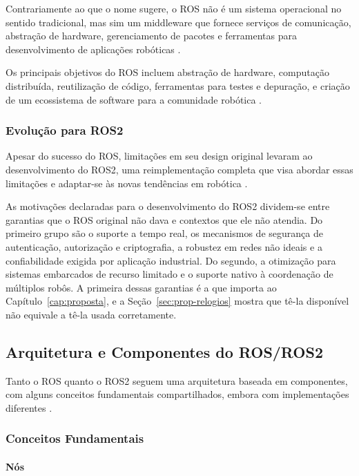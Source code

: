 Contrariamente ao que o nome sugere, o ROS não é um sistema operacional no sentido tradicional, mas sim um middleware que fornece serviços de comunicação, abstração de hardware, gerenciamento de pacotes e ferramentas para desenvolvimento de aplicações robóticas \cite{Quigley2009, Joseph2018}.

Os principais objetivos do ROS incluem abstração de hardware, computação distribuída, reutilização de código, ferramentas para testes e depuração, e criação de um ecossistema de software para a comunidade robótica \cite{Quigley2009}.

\subsubsection{Evolução para ROS2}

Apesar do sucesso do ROS, limitações em seu design original levaram ao desenvolvimento do ROS2, uma reimplementação completa que visa abordar essas limitações e adaptar-se às novas tendências em robótica \cite{Macenski2022}.

As motivações declaradas para o desenvolvimento do ROS2
\cite{Macenski2022, ROS2Design2024} dividem-se entre garantias que o ROS original não
dava e contextos que ele não atendia. Do primeiro grupo são o suporte a tempo real, os
mecanismos de segurança de autenticação, autorização e criptografia, a robustez em redes
não ideais e a confiabilidade exigida por aplicação industrial. Do segundo, a otimização
para sistemas embarcados de recurso limitado e o suporte nativo à coordenação de
múltiplos robôs. A primeira dessas garantias é a que importa ao Capítulo~\ref{cap:proposta},
e a Seção~\ref{sec:prop-relogios} mostra que tê-la disponível não equivale a tê-la
usada corretamente.

\subsection{Arquitetura e Componentes do ROS/ROS2}

Tanto o ROS quanto o ROS2 seguem uma arquitetura baseada em componentes, com alguns conceitos fundamentais compartilhados, embora com implementações diferentes \cite{Quigley2009, Macenski2022}.

\subsubsection{Conceitos Fundamentais}

\paragraph{Nós}

